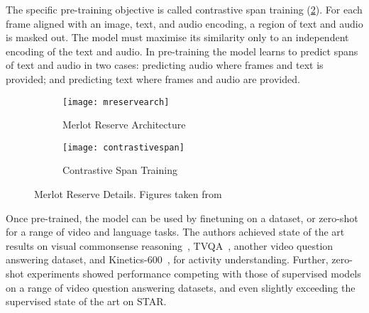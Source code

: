 The specific pre-training objective is called contrastive span training
(\cref{fig:contrastivespan}). For each frame aligned with an image, text,
and audio encoding, a region of text and audio is masked out. The model must
maximise its similarity only to an independent encoding of the text and audio.
In pre-training the model learns to predict spans of text and audio in two
cases: predicting audio where frames and text is provided; and predicting text
where frames and audio are provided. 

\begin{figure}[tp]
	\centering
	\begin{subfigure}[b]{0.45\textwidth}
		\centering
		\texttt{[image: mreservearch]}
		\caption{Merlot Reserve Architecture}
		\label{fig:mreservearch}
	\end{subfigure}
	\hfill
	\begin{subfigure}[b]{0.45\textwidth}
		\centering
		\texttt{[image: contrastivespan]}
		\caption{Contrastive Span Training}
		\label{fig:contrastivespan}
	\end{subfigure}
	\caption{Merlot Reserve Details. Figures taken from~\citet{zellers2022mreserve}}
	\label{fig:mreserve}
\end{figure}

Once pre-trained, the model can be used by finetuning on a dataset, or
zero-shot for a range of video and language tasks. The authors achieved state
of the art results on visual commonsense reasoning~\citep{zellers2019vcr},
TVQA~\citep{antol2015vqa}, another video question answering dataset, and
Kinetics-600~\citep{carreira2018kinetics600}, for activity understanding.
Further, zero-shot experiments showed performance competing with those of
supervised models on a range of video question answering datasets, and even
slightly exceeding the supervised state of the art on STAR.
